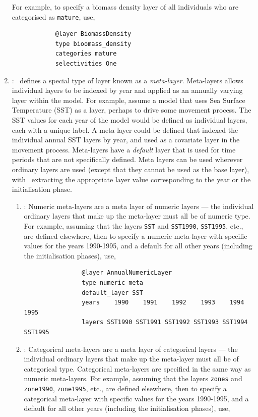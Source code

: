 \begin{enumerate}
	For example, to specify a biomass density layer of all individuals who are categorised as \texttt{mature}, use,
	{\small{\begin{verbatim}
			@layer BiomassDensity
			type bioomass_density
			categories mature
			selectivities One
			\end{verbatim}}}

	\item {\label{meta-layers}}: \IBM\ defines a special type of layer known as a \emph{meta-layer}. Meta-layers allows individual layers to be indexed by year and applied as an annually varying layer within the model. For example, assume a model that uses Sea Surface Temperature (SST) as a layer, perhaps to drive some movement process. The SST values for each year of the model would be defined as individual layers, each with a unique label. A meta-layer could be defined that indexed the individual annual SST layers by year, and used as a covariate layer in the movement process. Meta-layers have a \emph{default} layer that is used for time periods that are not specifically defined. Meta layers can be used wherever ordinary layers are used (except that they cannot be used as the base layer), with \IBM\ extracting the appropriate layer value corresponding to the year or the initialisation phase.
	
	\begin{enumerate}
		
		\item {\label{numeric meta-layer}}: Numeric meta-layers are a meta layer of numeric layers --- the individual ordinary layers that make up the meta-layer must all be of numeric type. For example, assuming that the layers \texttt{SST} and \texttt{SST1990}, \texttt{SST1995}, etc., are defined elsewhere, then to specify a numeric meta-layer with specific values for the years 1990-1995, and a default for all other years (including the initialisation phases), use, 
		
		{\small{\begin{verbatim}
				@layer AnnualNumericLayer
				type numeric_meta
				default_layer SST
				years    1990    1991    1992    1993    1994    1995
				layers SST1990 SST1991 SST1992 SST1993 SST1994 SST1995
				\end{verbatim}}}
		
		\item {\label{categorical meta-layer}}: Categorical meta-layers are a meta layer of categorical layers --- the individual ordinary layers that make up the meta-layer must all be of categorical type. Categorical meta-layers are specified in the same way as numeric meta-layers. For example, assuming that the layers \texttt{zones} and \texttt{zone1990}, \texttt{zone1995}, etc., are defined elsewhere, then to specify a categorical meta-layer with specific values for the years 1990-1995, and a default for all other years (including the initialisation phases), use, 
		

\end{enumerate}
\end{enumerate}
